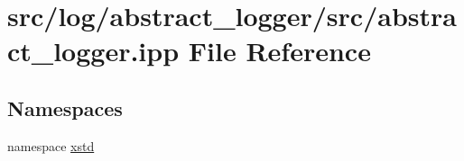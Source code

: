 \hypertarget{abstract__logger_8ipp}{\section{src/log/abstract\-\_\-logger/src/abstract\-\_\-logger.ipp File Reference}
\label{abstract__logger_8ipp}
}
\subsection*{Namespaces}
\begin{DoxyCompactItemize}
\item 
namespace \hyperlink{namespacexstd}{xstd}
\end{DoxyCompactItemize}
